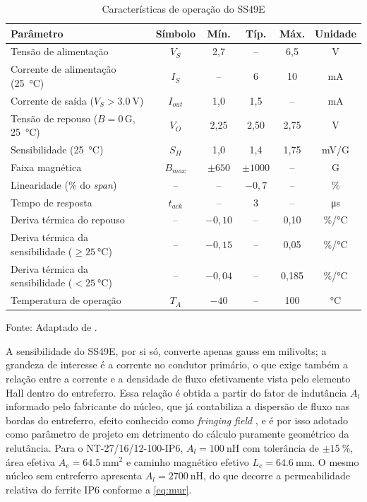 \begin{table}[H]
\centering
\caption{Características de operação do SS49E}
\label{tab:datasheet_ss49e}
\begin{tabular}{lccccc}
\toprule
\textbf{Parâmetro} & \textbf{Símbolo} & \textbf{Mín.} & \textbf{Típ.} & \textbf{Máx.} & \textbf{Unidade} \\
\midrule
Tensão de alimentação & $V_S$ & 2,7 & -- & 6,5 & V \\
Corrente de alimentação (\SI{25}{\celsius}) & $I_S$ & -- & 6 & 10 & mA \\
Corrente de saída ($V_S > \SI{3,0}{\volt}$) & $I_{out}$ & 1,0 & 1,5 & -- & mA \\
Tensão de repouso ($B=0\,\text{G}$, \SI{25}{\celsius}) & $V_O$ & 2,25 & 2,50 & 2,75 & V \\
Sensibilidade (\SI{25}{\celsius}) & $S_H$ & 1,0 & 1,4 & 1,75 & mV/G \\
Faixa magnética & $B_{max}$ & $\pm650$ & $\pm1000$ & -- & G \\
Linearidade (\% do \textit{span}) & -- & -- & $-0,7$ & -- & \% \\
Tempo de resposta & $t_{ack}$ & -- & 3 & -- & \si{\micro\second} \\
Deriva térmica do repouso & -- & $-0,10$ & -- & 0,10 & \%/\si{\celsius} \\
Deriva térmica da sensibilidade ($\geq\SI{25}{\celsius}$) & -- & $-0,15$ & -- & 0,05 & \%/\si{\celsius} \\
Deriva térmica da sensibilidade ($<\SI{25}{\celsius}$) & -- & $-0,04$ & -- & 0,185 & \%/\si{\celsius} \\
Temperatura de operação & $T_A$ & $-40$ & -- & 100 & \si{\celsius} \\
\bottomrule
\end{tabular}

Fonte: Adaptado de .
\end{table}

A sensibilidade do SS49E, por si só, converte apenas gauss em milivolts; a
grandeza de interesse é a corrente no condutor primário, o que exige também
a relação entre a corrente e a densidade de fluxo efetivamente vista pelo
elemento Hall dentro do entreferro. Essa relação é obtida a partir do fator
de indutância $A_l$ informado pelo fabricante do núcleo, que já contabiliza
a dispersão de fluxo nas bordas do entreferro, efeito conhecido como
\textit{fringing field} \cite{dewi2016}, e é por isso adotado como
parâmetro de projeto em detrimento do cálculo puramente geométrico da
relutância. Para o NT-27/16/12-100-IP6, $A_l = \SI{100}{\nano\henry}$ com
tolerância de $\pm\SI{15}{\percent}$, área efetiva
$A_e = \SI{64,5}{\milli\meter\squared}$ e caminho magnético efetivo
$L_e = \SI{64,6}{\milli\meter}$. O mesmo núcleo sem entreferro apresenta
$A_{l} = \SI{2700}{\nano\henry}$, do que decorre a permeabilidade relativa
do ferrite IP6 conforme a \autoref{eq:mur}.

